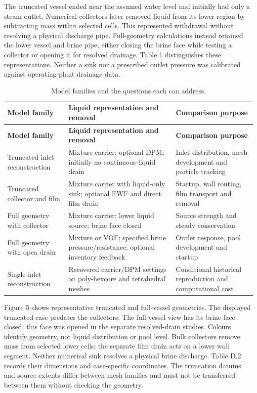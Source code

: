 The truncated vessel ended near the assumed water level and initially had only a steam outlet. Numerical collectors later removed liquid from its lower region by subtracting mass within selected cells. This represented withdrawal without resolving a physical discharge pipe. Full-geometry calculations instead retained the lower vessel and brine pipe, either closing the brine face while testing a collector or opening it for resolved drainage. Table 1 distinguishes these representations. Neither a sink nor a prescribed outlet pressure was calibrated against operating-plant drainage data.

\begin{longtable}{@{}>{\raggedright\arraybackslash}p{0.29000000\dimexpr\linewidth-4\tabcolsep\relax}>{\raggedright\arraybackslash}p{0.34000000\dimexpr\linewidth-4\tabcolsep\relax}>{\raggedright\arraybackslash}p{0.37000000\dimexpr\linewidth-4\tabcolsep\relax}@{}}
\caption{Model families and the questions each can address.}\label{tab:table-1}\\
\toprule
\textbf{Model family} & \textbf{Liquid representation and removal} & \textbf{Comparison purpose} \\
\midrule
\endfirsthead
\toprule
\textbf{Model family} & \textbf{Liquid representation and removal} & \textbf{Comparison purpose} \\
\midrule
\endhead
Truncated inlet reconstruction & Mixture carrier; optional DPM; initially no continuous-liquid drain & Inlet distribution, mesh development and particle tracking \\
Truncated collector and film & Mixture carrier with liquid-only sink; optional EWF and direct film drain & Startup, wall routing, film transport and removal \\
Full geometry with collector & Mixture carrier; lower liquid source; brine face closed & Source strength and steady conservation \\
Full geometry with open drain & Mixture or VOF; specified brine pressure/resistance; optional inventory feedback & Outlet response, pool development and startup \\
Single-inlet reconstruction & Recovered carrier/DPM settings on poly-hexcore and tetrahedral meshes & Conditional historical reproduction and computational cost \\
\bottomrule
\end{longtable}

Figure 5 shows representative truncated and full-vessel geometries. The displayed truncated case predates the collectors. The full-vessel view has its brine face closed; this face was opened in the separate resolved-drain studies. Colours identify geometry, not liquid distribution or pool level. Bulk collectors remove mass from selected lower cells; the separate film drain acts on a lower wall segment. Neither numerical sink resolves a physical brine discharge. Table D.2 records their dimensions and case-specific coordinates. The truncation datums and source extents differ between mesh families and must not be transferred between them without checking the geometry.

